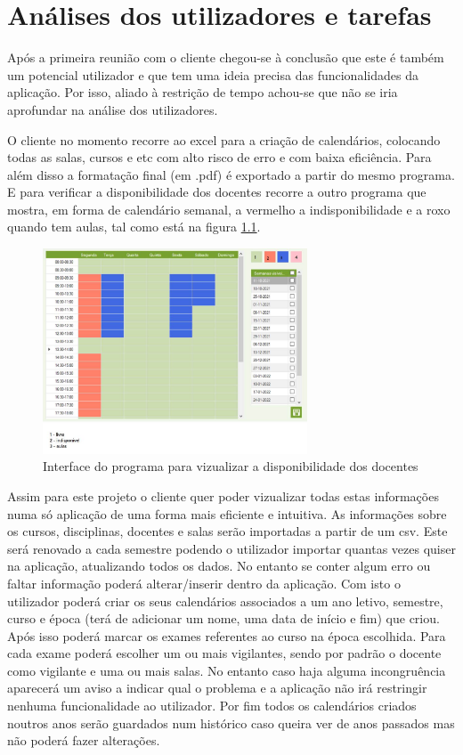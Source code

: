 \documentclass[11pt, twoside]{report}
\begin{document}
	
	\chapter{Análises dos utilizadores e tarefas}
	
	Após a primeira reunião com o cliente chegou-se à conclusão que  este é também um potencial utilizador e que tem uma ideia precisa das funcionalidades da aplicação. Por isso, aliado à restrição de tempo achou-se que não se iria aprofundar na análise dos utilizadores. 
	
	O cliente no momento recorre ao excel para a criação de calendários,  colocando todas as salas, cursos e etc com alto risco de erro e com baixa eficiência. Para além disso a formatação final (em .pdf) é exportado a partir do mesmo programa. E para verificar a disponibilidade dos docentes recorre a outro programa que mostra, em forma de calendário semanal, a vermelho a indisponibilidade e a roxo quando tem aulas, tal como está na figura \ref{disponibilidadedocentes}. 
	
	
	\begin{figure}[H] 
		\centering 
		\includegraphics[width=0.7\textwidth,height=0.7\textheight,keepaspectratio]{image/ColorMap}
		\caption{Interface do programa para vizualizar a disponibilidade dos docentes}
		\label{disponibilidadedocentes}
	\end{figure}
	

	Assim para este projeto o cliente quer poder vizualizar todas estas informações numa só aplicação de uma forma mais eficiente e intuitiva. As informações sobre os cursos, disciplinas, docentes e salas serão importadas a partir de um csv. Este será renovado a cada semestre podendo o utilizador importar quantas vezes quiser na aplicação, atualizando todos os dados. No entanto se conter algum erro ou faltar informação poderá alterar/inserir dentro da aplicação. Com isto o utilizador poderá criar os seus calendários associados a um ano letivo, semestre, curso e época (terá de adicionar um nome, uma data de início e fim) que criou. Após isso poderá marcar os exames referentes ao curso na época escolhida. Para cada exame poderá escolher um ou mais vigilantes, sendo por padrão o docente como vigilante e uma ou mais salas. No entanto caso haja alguma incongruência aparecerá um aviso a indicar qual o problema e a aplicação não irá restringir nenhuma funcionalidade ao utilizador. Por fim todos os calendários criados noutros anos serão guardados num histórico caso queira ver de anos passados mas não poderá fazer alterações.
	
\end{document}
